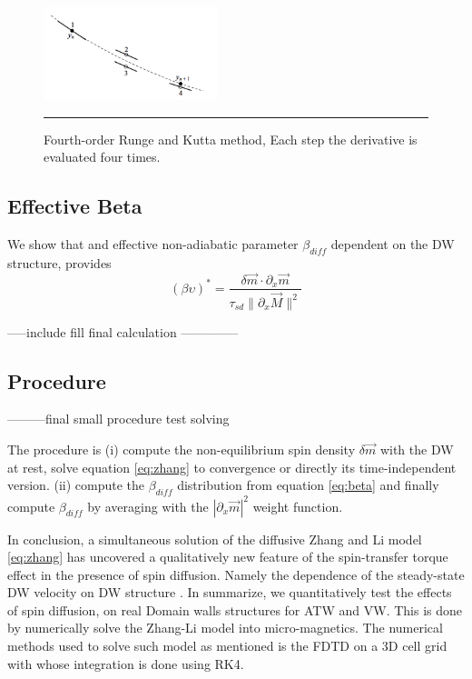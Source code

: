 \begin{figure}[htbp]
	\centering
		\includegraphics[width=0.45\textwidth]{Figures/rk4.png}
		\rule{35em}{0.5pt}
	\caption[Fourth-order Runge and Kutta Method]{Fourth-order Runge and Kutta method, Each step the derivative is evaluated four times. }
	\label{fig:kutta}
\end{figure}

\subsection{Effective Beta}

We show that and effective non-adiabatic parameter $\beta_{diff}$ dependent on the DW structure, provides 
\begin{equation} \label{eq:beta}
(\beta \upsilon)^{*} = \frac{\delta\vec{m} \cdot \partial_x \vec{m}}{\tau_{sd} \| \partial_x \vec{M} \|^2}
\end{equation}


-----include fill final calculation --------------

\subsection{Procedure}

---------final small procedure test solving

The procedure is (i) compute the non-equilibrium spin density $\delta \vec{m}$ with the DW at rest, solve equation \ref{eq:zhang} to convergence or directly its time-independent version. (ii) compute the $\beta_{diff}$ distribution from equation \ref{eq:beta} and finally compute $\beta_{diff}$ by averaging with the $| \partial_x \vec{m}|^2$ weight function.


\vspace{3.5em}

In conclusion, a simultaneous solution of the diffusive Zhang and Li model \ref{eq:zhang} has uncovered a qualitatively new feature of the spin-transfer torque effect in the presence of spin diffusion. Namely the dependence of the steady-state DW velocity on DW structure \cite{claudio}. In summarize, we quantitatively test the effects of spin diffusion, on real Domain walls structures for ATW and VW. This is done by numerically solve the Zhang-Li model into micro-magnetics. The numerical methods used to solve such model as mentioned is the FDTD on a 3D cell grid with whose integration is done using RK4.






